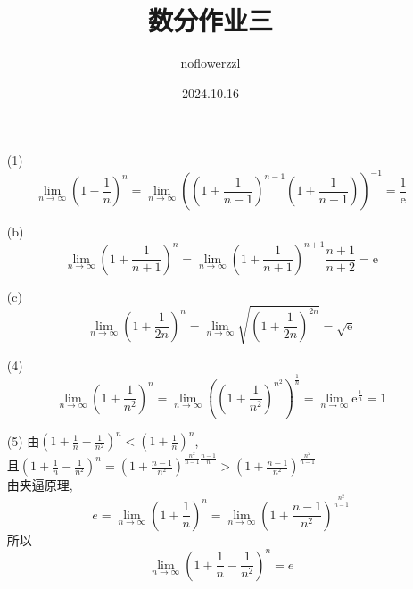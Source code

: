 \documentclass{article}
\title{数分作业三}
\author{noflowerzzl}
\date{2024.10.16}
\begin{document}
\maketitle

\section{}

\begin{itemize}
    \item[(1)]
    \[
        \lim_{n \to \infty}\left(1 - \frac{1}{n}\right)^n 
        = \lim_{n \to \infty}\left(\left(1 + \frac{1}{n - 1}\right)^{n - 1} \left(1 + \frac{1}{n - 1}\right)\right)^{-1}
        = \frac{1}{\text{e}}    
    \]
    \item[(b)]
    \[
        \lim_{n \to \infty}\left(1 + \frac{1}{n + 1}\right)^{n}
        = \lim_{n \to \infty}\left(1 + \frac{1}{n + 1}\right)^{n + 1}\frac{n + 1}{n + 2}
        = \text{e}
    \]
    \item[(c)]\[
        \lim_{n \to \infty}\left(1 + \frac{1}{2n}\right)^n
        = \lim_{n \to \infty}\sqrt{\left(1 + \frac{1}{2n}\right)^{2n}}
        = \sqrt{\text{e}}
    \]
    \item[(4)]\[
        \lim_{n \to \infty}\left(1 + \frac{1}{n^2}\right)^n
        = \lim_{n \to \infty}\left(\left(1 + \frac{1}{n^2}\right)^{n^2}\right)^{\frac{1}{n}}
        = \lim_{n \to \infty}\text{e}^{\frac{1}{n}} = 1
    \]
    \item[(5)]
    由$\displaystyle{\left(1 + \frac{1}{n} - \frac{1}{n^2}\right)^n < \left(1 + \frac{1}{n}\right)^n}$, \\
    且$\displaystyle{\left(1 + \frac{1}{n} - \frac{1}{n^2}\right)^n
     = \left(1 + \frac{n - 1}{n^2}\right)^{\frac{n^2}{n - 1}\frac{n - 1}{n}}
     > \left(1 + \frac{n - 1}{n^2}\right)^{\frac{n^2}{n - 1}}}$ \\
    由夹逼原理,
    \[
        e = \lim_{n \to \infty}\left(1 + \frac{1}{n}\right)^n 
        = \lim_{n \to \infty}\left(1 + \frac{n - 1}{n^2}\right)^{\frac{n^2}{n - 1}}   
    \]
    所以
    \[
        \lim_{n \to \infty}\left(1 + \frac{1}{n} - \frac{1}{n^2}\right)^n = e
    \]
\end{itemize}

\section{}
\end{document}
